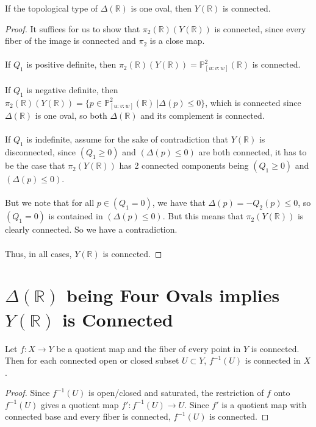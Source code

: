 \documentclass{article}
\newcommand{\Rbb}{\mathbb{R}}
\newcommand{\Pbb}{\mathbb{P}}
\begin{document}
\begin{proposition}
If the topological type of $\Delta(\Rbb)$ is one oval, then $Y(\Rbb)$ is connected.
\end{proposition}

\begin{proof}
It suffices for us to show that $\pi_2(\Rbb)(Y(\Rbb))$ is connected, since every fiber of the image is connected and $\pi_2$ is a close map.\\\\
If $Q_1$ is positive definite, then $\pi_2(\Rbb)(Y(\Rbb)) = \Pbb^2_{[u:v:w]}(\Rbb)$ is connected.\\\\
If $Q_1$ is negative definite, then $\pi_2(\Rbb)(Y(\Rbb)) = \{p \in \Pbb^2_{[u:v:w]}(\Rbb)\ | \Delta(p) \leq 0\}$, which is connected since $\Delta(\Rbb)$ is one oval, so both $\Delta(\Rbb)$ and its complement is connected.\\\\
If $Q_1$ is indefinite, assume for the sake of contradiction that $Y(\Rbb)$ is disconnected, since $(Q_1 \geq 0)$ and $(\Delta(p) \leq 0)$ are both connected, it has to be the case that $\pi_2(Y(\Rbb))$ has 2 connected components being $(Q_1 \geq 0)$ and $(\Delta(p) \leq 0)$.\\\\
But we note that for all $p \in (Q_1 = 0)$, we have that $\Delta(p) = -Q_2(p) \leq 0$, so $(Q_1 = 0)$ is contained in $(\Delta(p) \leq 0)$. But this means that $\pi_2(Y(\Rbb))$ is clearly connected. So we have a contradiction.\\\\
Thus, in all cases, $Y(\Rbb)$ is connected.
\end{proof}

\section{$\Delta(\Rbb)$ being Four Ovals implies $Y(\Rbb)$ is Connected}

\begin{lemma}
Let $f: X \to Y$ be a quotient map and the fiber of every point in $Y$ is connected. Then for each connected open or closed subset $U \subset Y$, $f^{-1}(U)$ is connected in $X$.
\end{lemma}

\begin{proof}
Since $f^{-1}(U)$ is open/closed and saturated, the restriction of $f$ onto $f^{-1}(U)$ gives a quotient map $f': f^{-1}(U) \to U$. Since $f'$ is a quotient map with connected base and every fiber is connected, $f^{-1}(U)$ is connected.
\end{proof}
\end{document}
